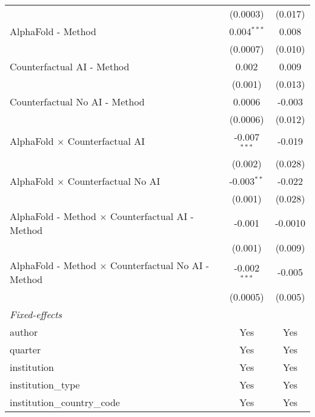 \begin{tabular}{lcc}
                                                              & (0.0003)       & (0.017)\\   
   AlphaFold - Method                                         & 0.004$^{***}$  & 0.008\\   
                                                              & (0.0007)       & (0.010)\\   
   Counterfactual AI - Method                                 & 0.002          & 0.009\\   
                                                              & (0.001)        & (0.013)\\   
   Counterfactual No AI - Method                              & 0.0006         & -0.003\\   
                                                              & (0.0006)       & (0.012)\\   
   AlphaFold $\times$ Counterfactual AI                       & -0.007$^{***}$ & -0.019\\   
                                                              & (0.002)        & (0.028)\\   
   AlphaFold $\times$ Counterfactual No AI                    & -0.003$^{**}$  & -0.022\\   
                                                              & (0.001)        & (0.028)\\   
   AlphaFold - Method $\times$ Counterfactual AI - Method     & -0.001         & -0.0010\\   
                                                              & (0.001)        & (0.009)\\   
   AlphaFold - Method $\times$ Counterfactual No AI - Method  & -0.002$^{***}$ & -0.005\\   
                                                              & (0.0005)       & (0.005)\\   
   \midrule
   \emph{Fixed-effects}\\
   author                                                     & Yes            & Yes\\  
   quarter                                                    & Yes            & Yes\\  
   institution                                                & Yes            & Yes\\  
   institution\_type                                          & Yes            & Yes\\  
   institution\_country\_code                                 & Yes            & Yes\\  

\end{tabular}
